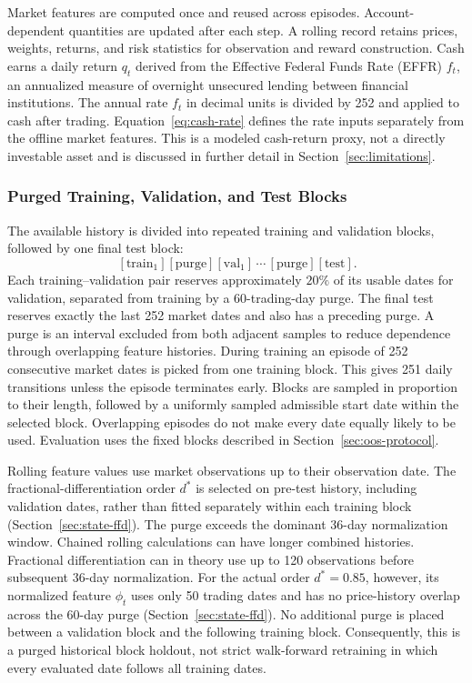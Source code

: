 Market features are computed once and reused across episodes. Account-dependent quantities are updated after each step. A rolling record retains prices, weights, returns, and risk statistics for observation and reward construction. Cash earns a daily return \(q_t\) derived from the Effective Federal Funds Rate (EFFR) \(f_t\), an annualized measure of overnight unsecured lending between financial institutions. The annual rate \(f_t\) in decimal units is divided by 252 and applied to cash after trading. Equation~\eqref{eq:cash-rate} defines the rate inputs separately from the offline market features. This is a modeled cash-return proxy, not a directly investable asset and is discussed in further detail in Section~\ref{sec:limitations}.

\subsubsection{Purged Training, Validation, and Test Blocks}

The available history is divided into repeated training and validation blocks, followed by one final test block:
\begin{equation}
[\text{train}_0][\text{purge}][\text{val}_0]\,[\text{train}_1][\text{purge}][\text{val}_1]\,\cdots\,[\text{purge}][\text{test}].
\end{equation}
Each training--validation pair reserves approximately \(20\%\) of its usable dates for validation, separated from training by a 60-trading-day purge. The final test reserves exactly the last 252 market dates and also has a preceding purge. A purge is an interval excluded from both adjacent samples to reduce dependence through overlapping feature histories. During training an episode of 252 consecutive market dates is picked from one training block. This gives 251 daily transitions unless the episode terminates early. Blocks are sampled in proportion to their length, followed by a uniformly sampled admissible start date within the selected block. Overlapping episodes do not make every date equally likely to be used. Evaluation uses the fixed blocks described in Section~\ref{sec:oos-protocol}.

Rolling feature values use market observations up to their observation date. The fractional-differentiation order \(d^\ast\) is selected on pre-test history, including validation dates, rather than fitted separately within each training block (Section~\ref{sec:state-ffd}). The purge exceeds the dominant 36-day normalization window. Chained rolling calculations can have longer combined histories. Fractional differentiation can in theory use up to 120 observations before subsequent 36-day normalization. For the actual order \(d^\ast=0.85\), however, its normalized feature \(\phi_t\) uses only 50 trading dates and has no price-history overlap across the 60-day purge (Section~\ref{sec:state-ffd}). No additional purge is placed between a validation block and the following training block. Consequently, this is a purged historical block holdout, not strict walk-forward retraining in which every evaluated date follows all training dates.

